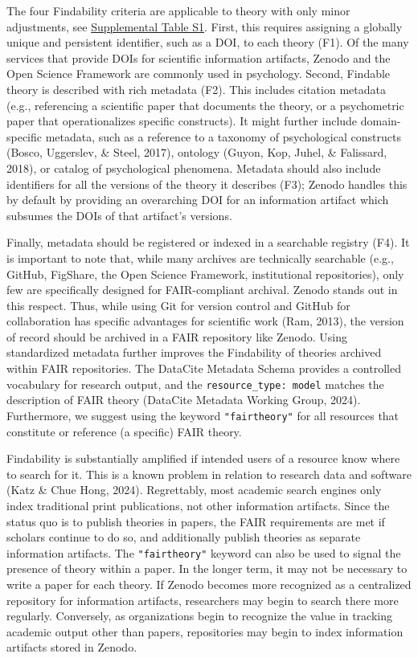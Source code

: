 \documentclass[
  man, noextraspace,floatsintext]{apa6}
\begin{document}
The four Findability criteria are applicable to theory with only minor adjustments, see \href{https://github.com/cjvanlissa/fair_theory/blob/main/fair_principles.csv}{Supplemental Table S1}.
First, this requires assigning a globally unique and persistent identifier, such as a DOI, to each theory (F1).
Of the many services that provide DOIs for scientific information artifacts,
Zenodo and the Open Science Framework are commonly used in psychology.
Second, Findable theory is described with rich metadata (F2).
This includes citation metadata (e.g., referencing a scientific paper that documents the theory, or a psychometric paper that operationalizes specific constructs).
It might further include domain-specific metadata, such as a reference to a taxonomy of psychological constructs (Bosco, Uggerslev, \& Steel, 2017),
ontology (Guyon, Kop, Juhel, \& Falissard, 2018),
or catalog of psychological phenomena.
Metadata should also include identifiers for all the versions of the theory it describes (F3);
Zenodo handles this by default by providing an overarching DOI for an information artifact which subsumes the DOIs of that artifact's versions.

Finally, metadata should be registered or indexed in a searchable registry (F4).
It is important to note that, while many archives are technically searchable (e.g., GitHub, FigShare, the Open Science Framework, institutional repositories),
only few are specifically designed for FAIR-compliant archival.
Zenodo stands out in this respect.
Thus, while using Git for version control and GitHub for collaboration has specific advantages for scientific work (Ram, 2013),
the version of record should be archived in a FAIR repository like Zenodo.
Using standardized metadata further improves the Findability of theories archived within FAIR repositories.
The DataCite Metadata Schema provides a controlled vocabulary for research output, and the \texttt{resource\_type:\ model} matches the description of FAIR theory (DataCite Metadata Working Group, 2024).
Furthermore, we suggest using the keyword \texttt{"fairtheory"} for all resources that constitute or reference (a specific) FAIR theory.

Findability is substantially amplified if intended users of a resource know where to search for it.
This is a known problem in relation to research data and software (Katz \& Chue Hong, 2024).
Regrettably, most academic search engines only index traditional print publications, not other information artifacts.
Since the status quo is to publish theories in papers,
the FAIR requirements are met if scholars continue to do so,
and additionally publish theories as separate information artifacts.
The \texttt{"fairtheory"} keyword can also be used to signal the presence of theory within a paper.
In the longer term, it may not be necessary to write a paper for each theory.
If Zenodo becomes more recognized as a centralized repository for information artifacts, researchers may begin to search there more regularly.
Conversely, as organizations begin to recognize the value in tracking academic output other than papers, repositories may begin to index information artifacts stored in Zenodo.
\end{document}
